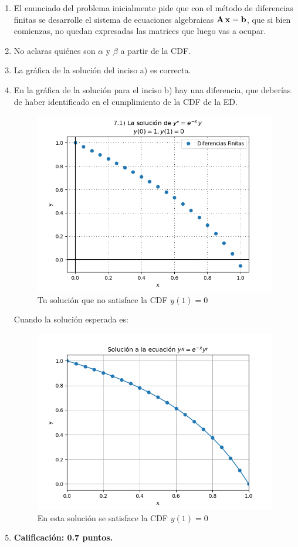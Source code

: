 \begin{enumerate}
\item El enunciado del problema inicialmente pide que con el método de diferencias finitas se desarrolle el sistema de ecuaciones algebraicas $\vb{A \, x} = \vb{b}$, que si bien comienzas, no quedan expresadas las matrices que luego vas a ocupar.
\item No aclaras quiénes son $\alpha$ y $\beta$ a partir de la CDF.
\item La gráfica de la solución del inciso a) es correcta.
\item En la gráfica de la solución para el inciso b) hay una diferencia, que deberías de haber identificado en el cumplimiento de la CDF de la ED.
\begin{figure}[H]
    \centering
    \includegraphics[scale=0.7]{Evidencia_Antonio_07.png}
    \caption{Tu solución que no satisface la CDF $y(1) = 0$}
\end{figure}
Cuando la solución esperada es:
\begin{figure}[H]
    \centering
    \includegraphics[scale=0.7]{Evidencia_Antonio_08.png}
    \caption{En esta solución se satisface la CDF $y(1) = 0$}
\end{figure}
\item \textbf{Calificación: 0.7 puntos.}
\end{enumerate}

